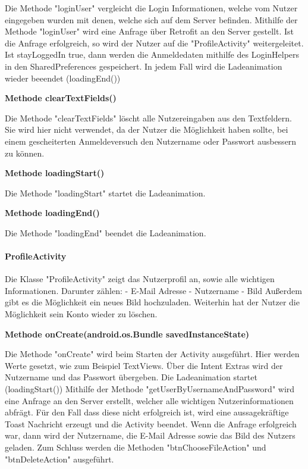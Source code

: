 \documentclass{scrartcl}
\begin{document}
\noindent Die Methode "loginUser" vergleicht die Login Informationen, welche vom Nutzer eingegeben wurden mit denen, welche sich auf dem Server befinden. Mithilfe der Methode "loginUser" wird eine Anfrage über Retrofit an den Server gestellt. Ist die Anfrage erfolgreich, so wird der Nutzer auf die "ProfileActivity" weitergeleitet. Ist stayLoggedIn true, dann werden die Anmeldedaten mithilfe des LoginHelpers in den SharedPreferences gespeichert. In jedem Fall wird die Ladeanimation wieder beeendet (loadingEnd()) \newline

\noindent\textbf{Methode clearTextFields()}

\noindent Die Methode "clearTextFields" löscht alle Nutzereingaben aus den Textfeldern. Sie wird hier nicht verwendet, da der Nutzer die Möglichkeit haben sollte, bei einem gescheiterten Anmeldeversuch den Nutzername oder Passwort ausbessern zu können. \newline 

\noindent\textbf{Methode loadingStart()}

\noindent Die Methode "loadingStart" startet die Ladeanimation. \newline

\noindent\textbf{Methode loadingEnd()}

\noindent Die Methode "loadingEnd" beendet die Ladeanimation. \newline

\newpage

\paragraph{ProfileActivity}
Die Klasse "ProfileActivity" zeigt das Nutzerprofil an, sowie alle wichtigen Informationen. Darunter zählen: - E-Mail Adresse - Nutzername - Bild Außerdem gibt es die Möglichkeit ein neues Bild hochzuladen. Weiterhin hat der Nutzer die Möglichkeit sein Konto wieder zu löschen. \newline 

\noindent\textbf{Methode onCreate(android.os.Bundle savedInstanceState)}

\noindent Die Methode "onCreate" wird beim Starten der Activity ausgeführt. Hier werden Werte gesetzt, wie zum Beispiel TextViews. Über die Intent Extras wird der Nutzername und das Passwort übergeben. Die Ladeanimation startet (loadingStart()) Mithilfe der Methode "getUserByUsernameAndPassword" wird eine Anfrage an den Server erstellt, welcher alle wichtigen Nutzerinformationen abfrägt. Für den Fall dass diese nicht erfolgreich ist, wird eine aussagekräftige Toast Nachricht erzeugt und die Activity beendet. Wenn die Anfrage erfolgreich war, dann wird der Nutzername, die E-Mail Adresse sowie das Bild des Nutzers geladen. Zum Schluss werden die Methoden "btnChooseFileAction" und "btnDeleteAction" ausgeführt. \newline 
\end{document}
